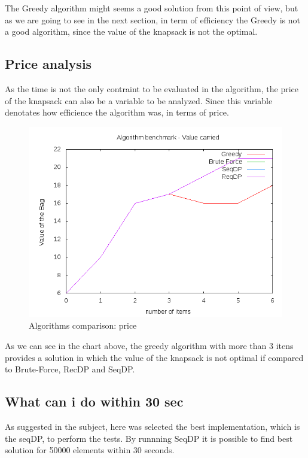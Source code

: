 \documentclass{article}
\begin{document}
The Greedy algorithm might seems a good solution from this point of view, but as we are going to see in the next section, 
in term of efficiency the Greedy is not a good algorithm, since the value of the knapsack is not the optimal.

\subsection{Price analysis}

As the time is not the only contraint to be evaluated in the algorithm, the price of the knapsack can also be a variable
to be analyzed. Since this variable denotates how efficience the algorithm was, in terms of price.

\begin{figure} [H]
\centering
\includegraphics[scale=0.5]{report/price_analysis}
\caption{Algorithms comparison: price}
\label{report/price_analysis}
\end{figure}

As we can see in the chart above, the greedy algorithm with more than 3 itens provides a solution in which the value of the 
knapsack is not optimal if compared to Brute-Force, RecDP and SeqDP.

\subsection{What can i do within 30 sec}

As suggested in the subject, here was selected the best implementation, which is the seqDP, to perform the tests. By runnning SeqDP it is 
possible to find best solution for 50000 elements within 30 seconds.
\end{document}
